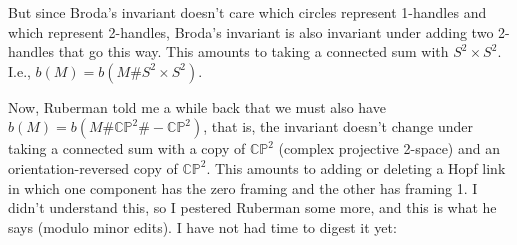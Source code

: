 \documentclass[12pt]{article}
\begin{document}
But since Broda's invariant doesn't care which circles represent
1-handles and which represent 2-handles, Broda's invariant is also
invariant under adding two 2-handles that go this way. This amounts to
taking a connected sum with \(S^2 \times S^2\). I.e.,
\(b(M) = b(M\# S^2 \times S^2)\).

Now, Ruberman told me a while back that we must also have
\(b(M) = b(M\#\mathbb{CP}^2\#-\mathbb{CP}^2)\), that is, the invariant
doesn't change under taking a connected sum with a copy of
\(\mathbb{CP}^2\) (complex projective 2-space) and an
orientation-reversed copy of \(\mathbb{CP}^2\). This amounts to adding
or deleting a Hopf link in which one component has the zero framing and
the other has framing 1. I didn't understand this, so I pestered
Ruberman some more, and this is what he says (modulo minor edits). I
have not had time to digest it yet:
\end{document}
